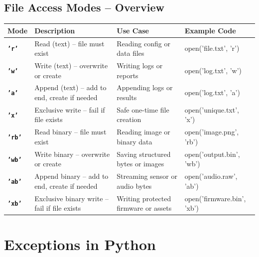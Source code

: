 \documentclass[a4paper,11pt]{article}
\begin{document}
		\vspace{1em}
		
		\subsection*{File Access Modes – Overview}
		
		\renewcommand{\arraystretch}{1.4}
		\begin{tabular}{>{\bfseries}p{2.2cm} p{5cm} p{3.3cm} >{\ttfamily}p{3.5cm}}
			\toprule
			Mode & Description & Use Case & Example Code \\
			\midrule
			
			\texttt{'r'}  & Read (text) – file must exist & Reading config or data files & open('file.txt', 'r') \\
			
			\texttt{'w'}  & Write (text) – overwrite or create & Writing logs or reports & open('log.txt', 'w') \\
			
			\texttt{'a'}  & Append (text) – add to end, create if needed & Appending logs or results & open('log.txt', 'a') \\
			
			\texttt{'x'}  & Exclusive write – fail if file exists & Safe one-time file creation & open('unique.txt', 'x') \\
			
			\texttt{'rb'} & Read binary – file must exist & Reading image or binary data & open('image.png', 'rb') \\
			
			\texttt{'wb'} & Write binary – overwrite or create & Saving structured bytes or images & open('output.bin', 'wb') \\
			
			\texttt{'ab'} & Append binary – add to end, create if needed & Streaming sensor or audio bytes & open('audio.raw', 'ab') \\
			
			\texttt{'xb'} & Exclusive binary write – fail if file exists & Writing protected firmware or assets & open('firmware.bin', 'xb') \\
			
			\bottomrule
		\end{tabular}
		
		\newpage
		
		
		\section{Exceptions in Python}
		\inputminted{python}{Python_Files/exceptions_guid.py}
		
\end{document}
